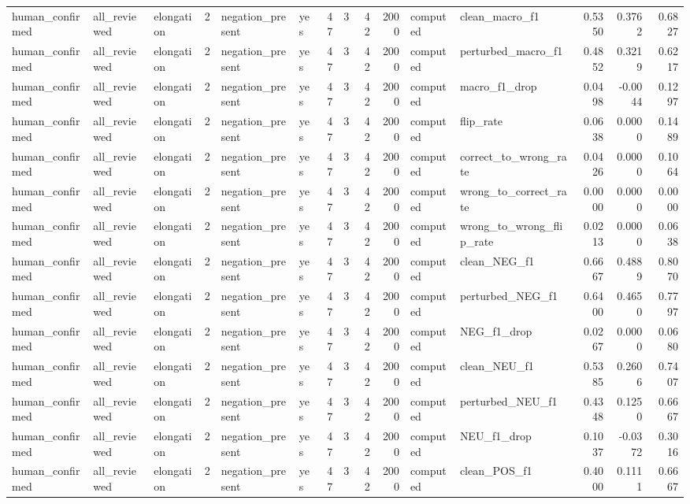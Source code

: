 \begin{tabular}{lllrllrrrrllrrr}
human_confirmed & all_reviewed & elongation & 2 & negation_present & yes & 47 & 3 & 42 & 2000 & computed & clean_macro_f1 & 0.5350 & 0.3762 & 0.6827 \\
human_confirmed & all_reviewed & elongation & 2 & negation_present & yes & 47 & 3 & 42 & 2000 & computed & perturbed_macro_f1 & 0.4852 & 0.3219 & 0.6217 \\
human_confirmed & all_reviewed & elongation & 2 & negation_present & yes & 47 & 3 & 42 & 2000 & computed & macro_f1_drop & 0.0498 & -0.0044 & 0.1297 \\
human_confirmed & all_reviewed & elongation & 2 & negation_present & yes & 47 & 3 & 42 & 2000 & computed & flip_rate & 0.0638 & 0.0000 & 0.1489 \\
human_confirmed & all_reviewed & elongation & 2 & negation_present & yes & 47 & 3 & 42 & 2000 & computed & correct_to_wrong_rate & 0.0426 & 0.0000 & 0.1064 \\
human_confirmed & all_reviewed & elongation & 2 & negation_present & yes & 47 & 3 & 42 & 2000 & computed & wrong_to_correct_rate & 0.0000 & 0.0000 & 0.0000 \\
human_confirmed & all_reviewed & elongation & 2 & negation_present & yes & 47 & 3 & 42 & 2000 & computed & wrong_to_wrong_flip_rate & 0.0213 & 0.0000 & 0.0638 \\
human_confirmed & all_reviewed & elongation & 2 & negation_present & yes & 47 & 3 & 42 & 2000 & computed & clean_NEG_f1 & 0.6667 & 0.4889 & 0.8070 \\
human_confirmed & all_reviewed & elongation & 2 & negation_present & yes & 47 & 3 & 42 & 2000 & computed & perturbed_NEG_f1 & 0.6400 & 0.4650 & 0.7797 \\
human_confirmed & all_reviewed & elongation & 2 & negation_present & yes & 47 & 3 & 42 & 2000 & computed & NEG_f1_drop & 0.0267 & 0.0000 & 0.0680 \\
human_confirmed & all_reviewed & elongation & 2 & negation_present & yes & 47 & 3 & 42 & 2000 & computed & clean_NEU_f1 & 0.5385 & 0.2606 & 0.7407 \\
human_confirmed & all_reviewed & elongation & 2 & negation_present & yes & 47 & 3 & 42 & 2000 & computed & perturbed_NEU_f1 & 0.4348 & 0.1250 & 0.6667 \\
human_confirmed & all_reviewed & elongation & 2 & negation_present & yes & 47 & 3 & 42 & 2000 & computed & NEU_f1_drop & 0.1037 & -0.0372 & 0.3016 \\
human_confirmed & all_reviewed & elongation & 2 & negation_present & yes & 47 & 3 & 42 & 2000 & computed & clean_POS_f1 & 0.4000 & 0.1111 & 0.6667 \\

\end{tabular}

